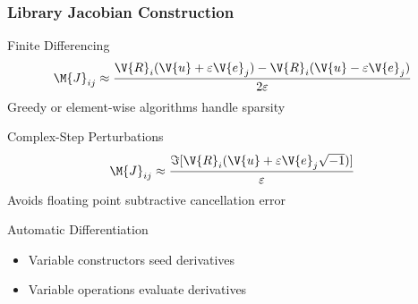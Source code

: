 \begin{frame}
\frametitle{Library Jacobian Construction}
\begin{block}{Finite Differencing}
\begin{equation*}
\M{J}_{ij} \approx \frac{\V{R}_i(\V{u} + \varepsilon \V{e}_j) -
\V{R}_i(\V{u} - \varepsilon \V{e}_j)}{2 \varepsilon}
\end{equation*}
Greedy or element-wise algorithms handle sparsity
\end{block}
\begin{block}{Complex-Step Perturbations}
\begin{equation*}
\M{J}_{ij} \approx \frac{\Im[\V{R}_i(\V{u} + \varepsilon
\V{e}_j \sqrt{-1})]}{\varepsilon}
\end{equation*}
Avoids floating point subtractive cancellation error
\end{block}
\begin{block}{Automatic Differentiation}
\begin{itemize}
\item Variable constructors seed derivatives
\item Variable operations evaluate derivatives
\end{itemize}
\end{block}
\end{frame}

